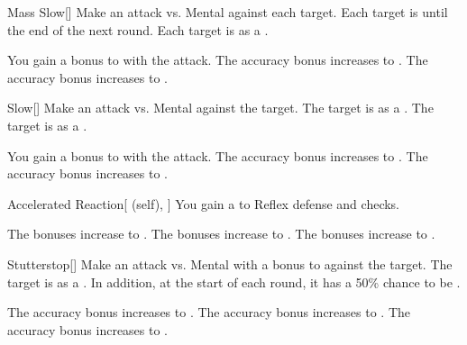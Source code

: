 \lowercase{\hypertarget{spell:Mass Slow}{}}\label{spell:Mass Slow}
\begin{freeability}[Rank 1]{\hypertarget{spell:Mass Slow}{Mass Slow}}[]
Make an attack vs. Mental against each target.
\hit Each target is  until the end of the next round.
\crit Each target is  as a .

\rankline
{} You gain a  bonus to  with the attack.
 The accuracy bonus increases to .
 The accuracy bonus increases to .
\end{freeability}
\vspace{0.25em}



\lowercase{\hypertarget{spell:Slow}{}}\label{spell:Slow}
\begin{freeability}[Rank 1]{\hypertarget{spell:Slow}{Slow}}[]
Make an attack vs. Mental against the target.
\hit The target is  as a .
\crit The target is  as a .

\rankline
{} You gain a  bonus to  with the attack.
 The accuracy bonus increases to .
 The accuracy bonus increases to .
\end{freeability}
\vspace{0.25em}



\lowercase{\hypertarget{spell:Accelerated Reaction}{}}\label{spell:Accelerated Reaction}
\begin{attuneability}[Rank 2]{\hypertarget{spell:Accelerated Reaction}{Accelerated Reaction}}[ (self), ]
You gain a   to Reflex defense and  checks.

\rankline
{} The bonuses increase to .
 The bonuses increase to .
 The bonuses increase to .
\end{attuneability}
\vspace{0.25em}



\lowercase{\hypertarget{spell:Stutterstop}{}}\label{spell:Stutterstop}
\begin{freeability}[Rank 2]{\hypertarget{spell:Stutterstop}{Stutterstop}}[]
Make an attack vs. Mental with a  bonus to  against the target.
\hit The target is  as a .
In addition, at the start of each round, it has a 50\% chance to be  .

\rankline
{} The accuracy bonus increases to .
 The accuracy bonus increases to .
 The accuracy bonus increases to .
\end{freeability}
\vspace{0.25em}



